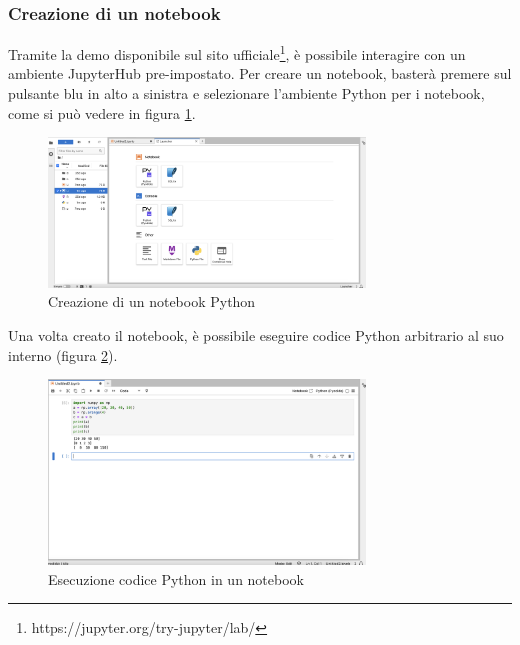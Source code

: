 \subsubsection{Creazione di un notebook}
Tramite la demo disponibile sul sito ufficiale\footnote{https://jupyter.org/try-jupyter/lab/}, è possibile interagire con un ambiente JupyterHub pre-impostato.
\newline
Per creare un notebook, basterà premere sul pulsante blu in alto a sinistra e selezionare l'ambiente Python per i notebook, come si può vedere in figura \ref{fig:jupyter-interface-2}.
\begin{figure}[h]
    \centering
    \includegraphics[width=0.75\textwidth]{images/jupyter-hub-2.png}
    \caption{Creazione di un notebook Python}
    \label{fig:jupyter-interface-2}
\end{figure}
\newline
Una volta creato il notebook, è possibile eseguire codice Python arbitrario al suo interno (figura \ref{fig:jupyter-interface-3}).
\begin{figure}[h]
    \centering
    \includegraphics[width=0.75\textwidth]{images/jupyter-hub-3.png}
    \caption{Esecuzione codice Python in un notebook}
    \label{fig:jupyter-interface-3}
\end{figure}
\newpage
